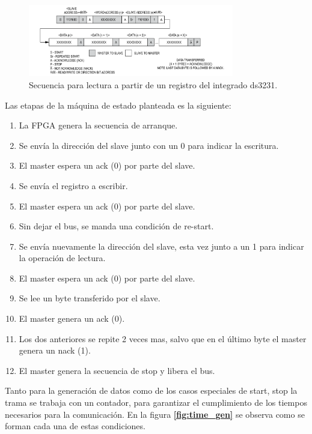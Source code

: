 \documentclass[11pt, a4paper]{article}
\begin{document}
		\begin{figure}[H]
			\centering
			\includegraphics[width=0.8\textwidth]{Imagenes/fsm-ds.png}
			\caption{Secuencia para lectura a partir de un registro del integrado ds3231.}
			\label{fig:fsm_ds}
		\end{figure} 
	
	Las etapas de la máquina de estado planteada es la siguiente:
	\begin{enumerate}\itemsep 0em
		\item La FPGA genera la secuencia de arranque.
		\item Se envía la dirección del slave junto con un 0 para indicar la escritura.
		\item El master espera un ack (0) por parte del slave.
		\item Se envía el registro a escribir.
		\item El master espera un ack (0) por parte del slave.
		\item Sin dejar el bus, se manda una condición de re-start.
		\item Se envía nuevamente la dirección del slave, esta vez junto a un 1 para indicar la operación de lectura.
		\item El master espera un ack (0) por parte del slave.
		\item Se lee un byte transferido por el slave.
		\item El master genera un ack (0).
		\item Los dos anteriores se repite 2 veces mas, salvo que en el último byte el master genera un nack (1).
		\item El master genera la secuencia de stop y libera el bus.
	\end{enumerate}

	Tanto para la generación de datos como de los casos especiales de start, stop la trama se trabaja con un contador, para garantizar el cumplimiento de los tiempos necesarios para la comunicación. En la figura \textcolor{blue}{\textbf{\ref{fig:time_gen}}} se observa como se forman cada una de estas condiciones.
\end{document}
